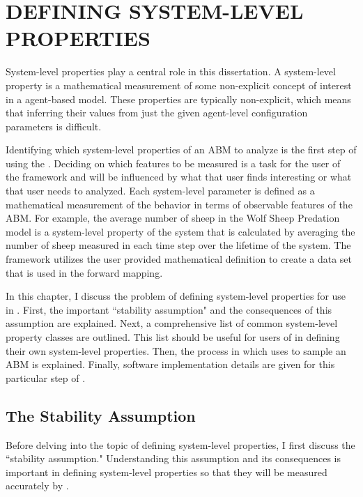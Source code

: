 \chapter{DEFINING SYSTEM-LEVEL PROPERTIES}
\thispagestyle{plain}

\label{Defining}

System-level properties play a central role in this dissertation.
A system-level property is a mathematical measurement of some non-explicit concept of interest in a agent-based model.
These properties are typically non-explicit, which means that inferring their values from just the given agent-level configuration parameters is difficult.

Identifying which system-level properties of an ABM to analyze is the first step of using the \framework.
Deciding on which features to be measured is a task for the user of the framework and will be influenced by what that user finds interesting or what that user needs to analyzed.
Each system-level parameter is defined as a mathematical measurement of the behavior in terms of observable features of the ABM.
For example, the average number of sheep in the Wolf Sheep Predation model is a system-level property of the system that is calculated by averaging the number of sheep measured in each time step over the lifetime of the system.
The framework utilizes the user provided mathematical definition to create a data set that is used in the forward mapping.

In this chapter, I discuss the problem of defining system-level properties for use in \fw.
First, the important ``stability assumption" and the consequences of this assumption are explained.
Next, a comprehensive list of common system-level property classes are outlined.
This list should be useful for users of \fw in defining their own system-level properties.
Then, the process in which \fw uses to sample an ABM is explained.
Finally, software implementation details are given for this particular step of \fw.


\section{The Stability Assumption}

Before delving into the topic of defining system-level properties, I first discuss the ``stability assumption."
Understanding this assumption and its consequences is important in defining system-level properties so that they will be measured accurately by \fw.


